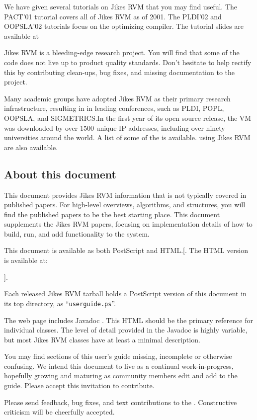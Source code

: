 We have given several tutorials on Jikes RVM that you may find
useful. The PACT'01 tutorial covers all of Jikes RVM as of 2001.  The PLDI'02 and
OOPSLA'02 tutorials focus on the optimizing compiler.  The tutorial
slides are available at
\begin{quote}
\xlink{{\tt \RVMSlidesURL}}{\RVMSlidesURL}
\end{quote}

Jikes RVM is a bleeding-edge research project.  You will find that
some of the code does not live up to product quality standards.  Don't
hesitate to help rectify this by contributing clean-ups, bug fixes,
and missing documentation to the project.

Many academic groups have adopted Jikes RVM as their primary research
infrastructure, resulting in
in leading
conferences, such as PLDI, POPL, OOPSLA, and SIGMETRICS.\@  In the first year
of its open source release, the VM was downloaded by over
1500 unique IP addresses, including over ninety
universities around the world. A list
of some of the  is available.
 using
Jikes RVM are also available.

\subsection{About this document}

This document provides Jikes\TMweb{} RVM information that is not
typically covered in published papers.  For high-level overviews,
algorithms, and structures, you will find the published papers to be
the best starting place. This document supplements the Jikes RVM
papers, focusing on implementation details of how to build, run,
and add functionality to the system.

This document is available as both PostScript\Rboth{} and HTML.\@  {}[.  The HTML version is
available at:
\begin{example}
\RVMUserGuideURL
\end{example}
].

Each released Jikes RVM tarball holds a PostScript version of this
document in its top directory, as ``{\tt userguide.ps}''.


The \jrvm{} web page includes Javadoc\TMboth{}
. 
This HTML should be the primary reference for individual classes. The
level of detail provided in the Javadoc is highly variable, but most
Jikes RVM classes have at least a minimal description.

You may find sections of this user's guide missing, incomplete or
otherwise confusing. We intend this document to live as a continual
work-in-progress, hopefully growing and maturing as community members
edit and add to the guide.  Please accept this invitation to
contribute.

Please send feedback, bug fixes, and text contributions to the 
.  
Constructive criticism will be cheerfully accepted. 

